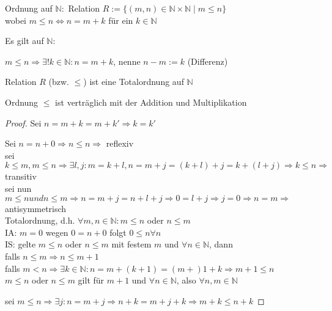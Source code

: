 Ordnung auf $\mathbb N:$ Relation $R := \{(m,n) \in \mathbb N \times \mathbb N \mid m \le n\}$ \\
wobei $m \le n \iff n=m+k$ f\"ur ein $k \in \mathbb N$ \\

\begin{satz}
	Es gilt auf $\mathbb N:$
	\begin{compactitem}
		\item $m \le n \Rightarrow \exists ! k \in \mathbb N: n=m+k$, nenne $n-m:=k$ (Differenz)
		\item Relation $R$ (bzw. $\le$) ist eine Totalordnung auf $\mathbb N$
		\item Ordnung $\le$ ist vertr\"aglich mit der Addition und Multiplikation
	\end{compactitem}
\end{satz}

\begin{proof}
	\item Sei $n=m+k=m+k' \Rightarrow k=k'$
	\item Sei $n=n+0 \Rightarrow n \le n \Rightarrow$ reflexiv \\
	sei $k\le m, m \le n \Rightarrow \exists l,j: m=k+l, n=m+j=(k+l)+j=k+(l+j) \Rightarrow
	k \le n \Rightarrow$ transitiv \\
	sei nun $m \le n und n \le m \Rightarrow n=m+j=n+l+j \Rightarrow 0=l+j \Rightarrow j=0 
	\Rightarrow n=m \Rightarrow$ antisymmetrisch \\
	Totalordnung, d.h. $\forall m,n \in \mathbb N: m\le n$ oder $n\le m$ \\
	IA: $m=0$ wegen $0=n+0$ folgt $0 \le n \forall n$ \\
	IS: gelte $m\le n$ oder $n \le m$ mit festem $m$ und $\forall n \in \mathbb N$, dann \\
	falls $n \le m \Rightarrow n \le m+1$ \\
	falls $m < n \Rightarrow \exists k \in \mathbb N: n=m+(k+1)=(m+)1+k \Rightarrow m+1 \le n$ \\
	$m\le n$ oder $n \le m$ gilt für $m+1$ und $\forall n \in \mathbb N$, also $\forall n,m \in 
	\mathbb N$
	\item sei $m \le n \Rightarrow \exists j: n=m+j \Rightarrow n+k=m+j+k \Rightarrow m+k \le n+k$
	\QEDA
\end{proof}
